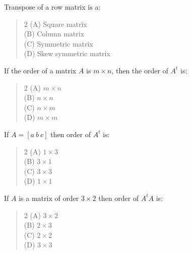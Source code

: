 \documentclass[11pt,a4paper]{article}
\begin{document}
\begin{mcqlist}
\item Transpose of a row matrix is a:
\begin{quote}\begin{multicols}{2}
\noindent (A) Square matrix \\
(B) Column matrix \\
(C) Symmetric matrix \\
(D) Skew symmetric matrix
\end{multicols}\end{quote}

\item If the order of a matrix $A$ is $m\times n$, then the order of $A^t$ is:
\begin{quote}\begin{multicols}{2}
\noindent (A) $m\times n$ \\
(B) $n\times n$ \\
(C) $n\times m$ \\
(D) $m\times m$
\end{multicols}\end{quote}

\item If $A=[a\ b\ c]$ then order of $A^t$ is:
\begin{quote}\begin{multicols}{2}
\noindent (A) $1\times3$ \\
(B) $3\times1$ \\
(C) $3\times3$ \\
(D) $1\times1$
\end{multicols}\end{quote}

\item If $A$ is a matrix of order $3\times2$ then order of $A^tA$ is:
\begin{quote}\begin{multicols}{2}
\noindent (A) $3\times2$ \\
(B) $2\times3$ \\
(C) $2\times2$ \\
(D) $3\times3$
\end{multicols}\end{quote}


\end{mcqlist}
\end{document}
